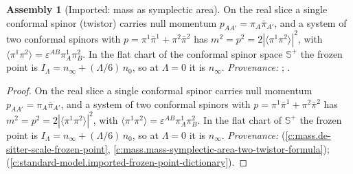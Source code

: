 \documentclass[11pt]{article}
\theoremstyle{definition}
\newtheorem{assembled}[theorem]{Assembly}
\theoremstyle{plain}
\providecommand{\CS}{}\renewcommand{\CS}{{\mathbb{S}^{+}}}
\providecommand{\br}{}\renewcommand{\br}[1]{\langle #1\rangle}
\begin{document}
\begin{assembled}[Imported: mass as symplectic area]\label{c:rungs.imported-mass-symplectic-area}
On the real slice a single conformal spinor (twistor) carries null momentum $p_{AA'} = \pi_{A}\bar\pi_{A'}$, and a system of two conformal spinors with $p = \pi^{1}\bar\pi^{1} + \pi^{2}\bar\pi^{2}$ has $m^{2} = p^{2} = 2|\br{\pi^{1}\pi^{2}}|^{2}$, with $\br{\pi^{1}\pi^{2}} = \varepsilon^{AB}\pi^{1}_{A}\pi^{2}_{B}$. In the flat chart of the conformal spinor space $\CS$ the frozen point is $I_{\Lambda} = n_{\infty} + (\Lambda/6)\,n_{0}$, so at $\Lambda = 0$ it is $n_{\infty}$. \emph{Provenance:} \cite[Prop.~4.1, Lem.~5.1]{ButlerT11}; \cite[Fact~2.5]{ButlerT12}.
\end{assembled}
\begin{proof}
On the real slice a single conformal spinor carries null momentum $p_{AA'} = \pi_{A}\bar\pi_{A'}$, and a system of two conformal spinors with $p = \pi^{1}\bar\pi^{1} + \pi^{2}\bar\pi^{2}$ has $m^{2} = p^{2} = 2|\br{\pi^{1}\pi^{2}}|^{2}$, with $\br{\pi^{1}\pi^{2}} = \varepsilon^{AB}\pi^{1}_{A}\pi^{2}_{B}$. In the flat chart of $\CS$ the frozen point is $I_{\Lambda} = n_{\infty} + (\Lambda/6)\,n_{0}$, so at $\Lambda = 0$ it is $n_{\infty}$. \emph{Provenance:} \cite[Prop.~4.1, Lem.~5.1]{ButlerT11} (\ref{c:mass.de-sitter-scale-frozen-point}, \ref{c:mass.mass-symplectic-area-two-twistor-formula}); \cite[Fact~2.5]{ButlerT12} (\ref{c:standard-model.imported-frozen-point-dictionary}).

\end{proof}
\end{document}
